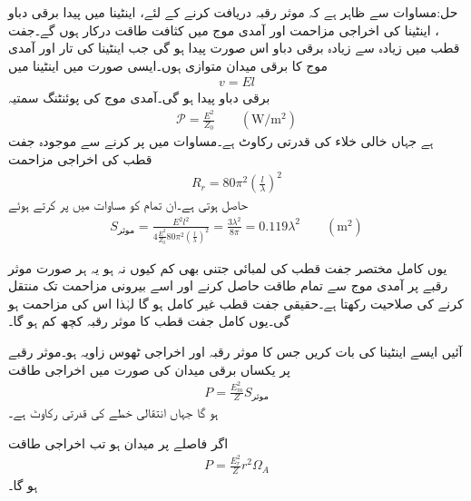 حل:مساوات  سے ظاہر ہے کہ موثر رقبہ دریافت کرنے کے لئے، اینٹینا میں پیدا برقی دباو ، اینٹینا کی اخراجی مزاحمت  اور آمدی موج میں کثافت طاقت  درکار ہوں گے۔جفت قطب میں زیادہ سے زیادہ برقی دباو اس صورت پیدا ہو گی جب اینٹینا کی تار اور آمدی موج کا برقی میدان متوازی ہوں۔ایسی صورت میں اینٹینا میں
\begin{align}
v=E l
\end{align}
برقی دباو پیدا ہو گی۔آمدی موج کی پوئنٹنگ سمتیہ
\begin{align}
\mathscr{P}=\frac{E^2}{Z_0} \quad \quad (\si{\watt/ \meter \squared})
\end{align}
ہے جہاں  خالی خلاء کی قدرتی رکاوٹ ہے۔مساوات  میں  پر کرنے سے موجودہ جفت قطب کی اخراجی مزاحمت
\begin{align}
R_r=80 \pi^2 \left(\frac{l}{\lambda}\right)^2
\end{align}
حاصل ہوتی ہے۔ان تمام کو مساوات  میں پر کرتے ہوئے
\begin{align}
S_{\text{موثر}} = \frac{E^2 l^2}{4 \frac{E^2}{Z_0} 80 \pi^2 \left(\frac{l}{\lambda}\right)^2  }=\frac{3\lambda^2}{8\pi}=0.119 \lambda^2 \quad \quad (\si{\meter \squared})
\end{align}

یوں کامل مختصر جفت قطب کی لمبائی جتنی بھی کم کیوں نہ ہو یہ ہر صورت  موثر رقبے پر آمدی موج سے تمام طاقت حاصل کرنے اور اسے بیرونی مزاحمت تک منتقل کرنے کی صلاحیت رکھتا ہے۔حقیقی جفت قطب غیر کامل ہو گا  لہٰذا اس کی مزاحمت  ہو گی۔یوں کامل جفت قطب کا موثر رقبہ کچھ کم ہو گا۔

آئیں ایسے اینٹینا کی بات کریں جس کا موثر رقبہ  اور اخراجی ٹھوس زاویہ  ہو۔موثر رقبے پر یکساں برقی میدان  کی صورت میں اخراجی طاقت
\begin{align}
P=\frac{E_m^2}{Z} S_{\text{موثر}}
\end{align}
ہو گا جہاں  انتقالی خطے کی قدرتی رکاوٹ ہے۔

اگر  فاصلے پر میدان  ہو تب اخراجی طاقت
\begin{align}
P=\frac{E_r^2}{Z} r^2 \Omega_A
\end{align}
ہو گا۔ 

